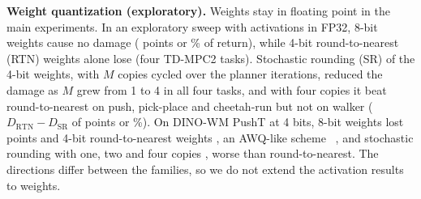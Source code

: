 \textbf{Weight quantization (exploratory).} Weights stay in floating point in the main experiments. In an exploratory sweep with activations in FP32, 8-bit weights cause no damage ( points or \% of return), while 4-bit round-to-nearest (RTN) weights alone lose  (four TD-MPC2 tasks). Stochastic rounding (SR) of the 4-bit weights, with $M$ copies cycled over the planner iterations, reduced the damage as $M$ grew from 1 to 4 in all four tasks, and with four copies it beat round-to-nearest on push, pick-place and cheetah-run but not on walker ($D_{\mathrm{RTN}}-D_{\mathrm{SR}}$ of  points or \%). On DINO-WM PushT at 4 bits, 8-bit weights lost  points and 4-bit round-to-nearest weights , an AWQ-like scheme~\citep{lin2024awq} , and stochastic rounding with one, two and four copies , worse than round-to-nearest. The directions differ between the families, so we do not extend the activation results to weights.
